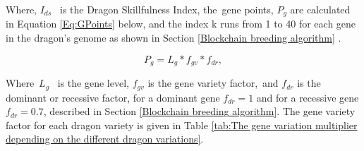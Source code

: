 \documentclass[12pt]{article}
\begin{document}
{\setlength{\parskip}{9.96pt}
Where,   $I_{ds}$ \  is the Dragon Skillfulness Index, the\ gene points,   $P_g$  are calculated in Equation   \ref{Eq:GPoints}   below, and the index k runs from 1 to 40 for each gene in the dragon’s genome as shown in Section  \ref{Blockchain breeding algorithm} . \par


\begin{center}
  \begin{equation} \label{Eq:GPoints}
     P_g=L_g*f_{gv}*f_{dr},
  \end{equation}
\end{center}
Where\   $L_g$ \ is the gene level,   $f_{gv}$  is the gene variety factor,\ and  $f_{dr}$   is the dominant or recessive factor, for a dominant gene   $f_{dr}=1$  and for a recessive gene   $f_{dr}=0.7$, described in  Section \ref{Blockchain breeding algorithm}. The gene variety factor for each dragon variety is given in  Table \ref{tab:The gene variation multiplier depending on the different dragon variations}.\par


\vspace{\baselineskip}




}
\end{document}
